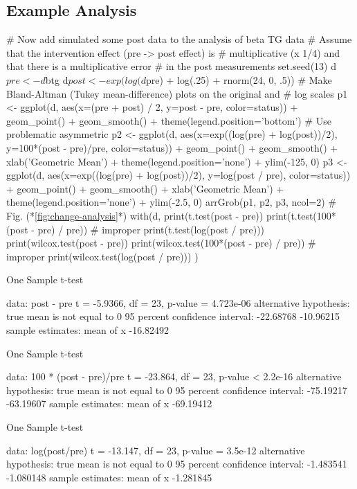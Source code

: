 \subsection{Example Analysis}
\begin{Schunk}
\begin{Sinput}
# Now add simulated some post data to the analysis of beta TG data
# Assume that the intervention effect (pre -> post effect) is
# multiplicative (x 1/4) and that there is a multiplicative error
# in the post measurements
set.seed(13)
d$pre  <- d$btg
d$post <- exp(log(d$pre) + log(.25) + rnorm(24, 0, .5))
# Make Bland-Altman (Tukey mean-difference) plots on the original and
# log scales
p1 <- ggplot(d, aes(x=(pre + post) / 2, y=post - pre, color=status)) +
  geom_point() + geom_smooth() + theme(legend.position='bottom')
# Use problematic asymmetric %
p2 <- ggplot(d, aes(x=exp((log(pre) + log(post))/2), y=100*(post - pre)/pre,
                    color=status)) + geom_point() + geom_smooth() +
      xlab('Geometric Mean') + theme(legend.position='none') +
      ylim(-125, 0)
p3 <- ggplot(d, aes(x=exp((log(pre) + log(post))/2), y=log(post / pre),
                    color=status)) + geom_point() + geom_smooth() +
      xlab('Geometric Mean') + theme(legend.position='none') + ylim(-2.5, 0)
arrGrob(p1, p2, p3, ncol=2)   # Fig. (*\ref{fig:change-analysis}*)
with(d, {
     print(t.test(post - pre))
     print(t.test(100*(post - pre) / pre))       # improper
     print(t.test(log(post / pre)))
     print(wilcox.test(post - pre))
     print(wilcox.test(100*(post - pre) / pre))  # improper
     print(wilcox.test(log(post / pre)))
     } )
\end{Sinput}
\begin{Soutput}

	One Sample t-test

data:  post - pre
t = -5.9366, df = 23, p-value = 4.723e-06
alternative hypothesis: true mean is not equal to 0
95 percent confidence interval:
 -22.68768 -10.96215
sample estimates:
mean of x 
-16.82492 


	One Sample t-test

data:  100 * (post - pre)/pre
t = -23.864, df = 23, p-value < 2.2e-16
alternative hypothesis: true mean is not equal to 0
95 percent confidence interval:
 -75.19217 -63.19607
sample estimates:
mean of x 
-69.19412 


	One Sample t-test

data:  log(post/pre)
t = -13.147, df = 23, p-value = 3.5e-12
alternative hypothesis: true mean is not equal to 0
95 percent confidence interval:
 -1.483541 -1.080148
sample estimates:
mean of x 
-1.281845 



\end{Soutput}
\end{Schunk}
